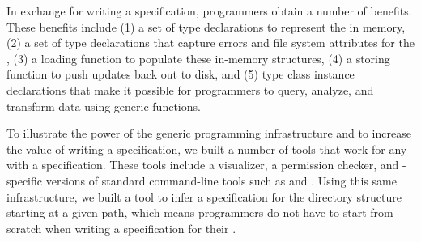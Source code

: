 
In exchange for writing a \forest{} specification,  programmers obtain
a number of benefits.  These benefits include 
(1) a set of type declarations to represent the \filestore{} in memory,
(2) a set of type declarations that capture errors and file system attributes for the \filestore{},
(3) a loading function to populate these in-memory structures, 
(4) a storing function to push updates back out to disk, and
(5) type class instance declarations that make it possible for
   programmers to query, analyze, and transform \filestore{} data
   using generic functions.

To illustrate the power of the generic programming infrastructure and
to increase the value of writing a \forest{} specification, we built a
number of tools that work for any \filestore{} with a
\forest{} specification.  These tools include a \filestore{}
visualizer, a permission checker, and \filestore{}-specific versions
of standard command-line tools such as  and .
Using this same infrastructure, we built a tool to infer
a \forest{} specification for the directory structure starting at a
given path, which means programmers do
not have to start from scratch when writing a specification for their
\filestores{}. 


